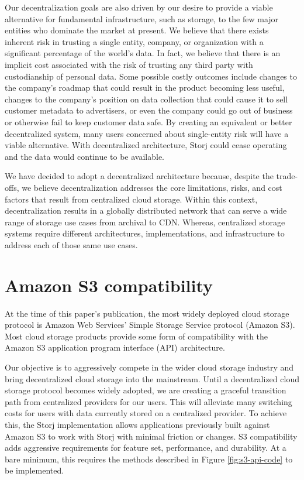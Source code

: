 \documentclass[8pt,fleqn,openany]{book}
\begin{document}
Our decentralization goals are also driven by our desire to provide a viable alternative for
fundamental infrastructure, such as storage, to the few major
entities who dominate the market at present.
We believe that there exists inherent risk in trusting a single entity,
company, or organization with a significant percentage of the world's data.
In fact, we believe that there is an implicit cost associated with the risk of
trusting any third party with custodianship of personal data.
Some possible costly outcomes include changes to the company's roadmap that could result in the product
becoming less useful, changes to the company's position on data collection that could
cause it to sell customer metadata to advertisers, or even the company could go
out of business or otherwise fail to keep customer data safe.
By creating an equivalent or better decentralized
system, many users concerned about single-entity risk will have a viable
alternative.
With decentralized architecture, Storj could cease operating and the data
would continue to be available.

We have decided to adopt a decentralized architecture because, despite the trade-offs, we believe decentralization addresses the core limitations,
risks, and cost factors that result from centralized cloud storage.
Within this context,
decentralization results in a globally distributed network that can
serve a wide range of storage use cases from archival to CDN. Whereas,
centralized storage systems require different architectures, implementations,
and infrastructure to address each of those same use cases.

\section{Amazon S3 compatibility}

At the time of this paper's publication, the most widely deployed cloud storage
protocol is Amazon Web Services' Simple Storage Service protocol (Amazon S3).
Most cloud storage products provide some form of compatibility with the
Amazon S3 application program interface (API) architecture.

Our objective is to aggressively compete in the wider cloud
storage industry and bring decentralized cloud storage into the mainstream.
Until a decentralized cloud storage protocol becomes widely adopted,
we are creating a graceful transition path from centralized
providers for our users.
This will alleviate many switching costs for users with data currently stored on
a centralized provider.
To achieve this, the Storj implementation allows
applications previously built against Amazon S3 to work with Storj with
minimal friction or changes.
S3 compatibility adds aggressive requirements for feature set, performance, and
durability.
At a bare minimum, this requires the methods described in
Figure \ref{fig:s3-api-code} to be implemented.
\end{document}
